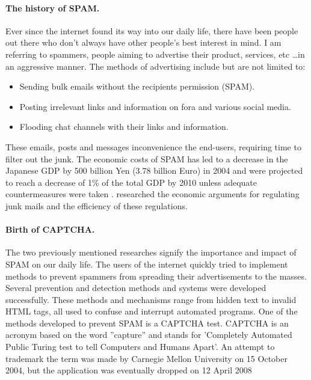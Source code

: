 \documentclass[pdftex,a4paper,12pt,twoside]{report}
\begin{document}
\paragraph{The history of SPAM.} 
Ever since the internet found its way into our daily life, there have been people out there who don't always have other people's best interest in mind. I am referring to spammers, people aiming to advertise their product, services, etc \ldots in an aggressive manner. The methods of advertising include but are not limited to: \begin{itemize}
\item Sending bulk emails without the recipients permission (SPAM). 
\item Posting irrelevant links and information on fora and various social media.
\item Flooding chat channels with their links and information. 
\end{itemize}
These emails, posts and messages inconvenience the end-users, requiring time to filter out the junk. The economic costs of SPAM has led to a decrease in the Japanese GDP by 500 billion Yen (3.78 billion Euro) in 2004 and were projected to reach a decrease of 1\% of the total GDP by 2010 unless adequate countermeasures were taken \citep{Ukai2007}. \citep{Khong2004} researched the economic arguments for regulating junk mails and the efficiency of these regulations.
\paragraph{Birth of CAPTCHA.} 
The two previously mentioned researches signify the importance and impact of SPAM on our daily life. The users of the internet quickly tried to implement methods to prevent spammers from spreading their advertisements to the masses. Several prevention and detection methods and systems were developed successfully. These methods and mechanisms range from hidden text to invalid HTML tags, all used to confuse and interrupt automated programs. One of the methods developed to prevent SPAM is a CAPTCHA test. CAPTCHA is an acronym based on the word ''capture'' and stands for 'Completely Automated Public Turing test to tell Computers and Humans Apart'. An attempt to trademark  the term was made by Carnegie Mellon University on 15 October 2004, but the application was eventually dropped on 12 April 2008
\end{document}

